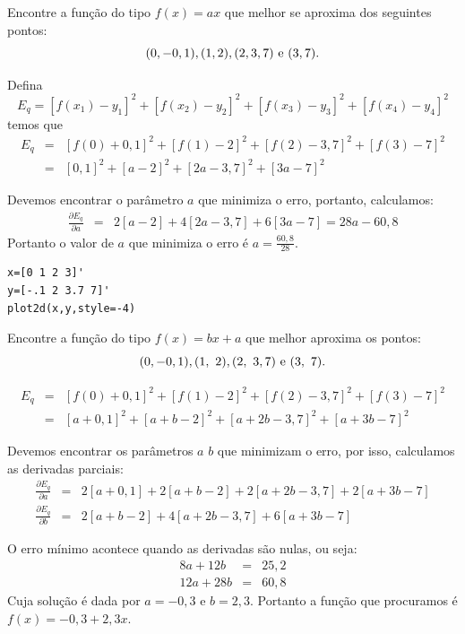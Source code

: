 \begin{ex} Encontre a função do tipo $f(x)=ax$ que melhor se aproxima dos seguintes pontos:
  \begin{equation*}
    (0, -0,1), (1, 2), (2, 3,7) ~ \hbox{e} ~(3, 7).  
  \end{equation*}
\end{ex}
\begin{sol}
Defina $$E_q=[f(x_1)-y_1]^2+[f(x_2)-y_2]^2+[f(x_3)-y_3]^2+[f(x_4)-y_4]^2$$
temos que
\begin{eqnarray*}
E_q&=&[f(0)+0,1]^2+[f(1)-2]^2+[f(2)-3,7]^2+[f(3)-7]^2\\
&=&[0,1]^2+[a-2]^2+[2a-3,7]^2+[3a-7]^2
\end{eqnarray*}

Devemos encontrar o parâmetro $a$ que minimiza o erro, portanto, calculamos:
\begin{eqnarray*}
\frac{\partial E_q}{\partial a}&=&2[a-2]+4[2a-3,7]+6[3a-7]=28a-60,8
\end{eqnarray*}
Portanto o valor de $a$ que minimiza o erro é $a=\frac{60,8}{28}$.
\ifisscilab
\begin{verbatim}
x=[0 1 2 3]'
y=[-.1 2 3.7 7]'
plot2d(x,y,style=-4)
\end{verbatim}
\fi
\end{sol}

\begin{ex}Encontre a função do tipo $f(x)=bx+a$ que melhor aproxima os pontos:
  \begin{equation*}
    (0,-0,1), (1,~2), (2,~3,7) ~ \hbox{e} ~(3,~7).  
  \end{equation*}
\end{ex}
\begin{sol}
\begin{eqnarray*}
E_q&=&[f(0)+0,1]^2+[f(1)-2]^2+[f(2)-3,7]^2+[f(3)-7]^2\\
&=&[a+0,1]^2+[a+b-2]^2+[a+2b-3,7]^2+[a+3b-7]^2
\end{eqnarray*}

Devemos encontrar os parâmetros $a$ $b$ que minimizam o erro, por isso, calculamos as derivadas parciais:
\begin{eqnarray*}
\frac{\partial E_q}{\partial a}&=&2[a+0,1]+2[a+b-2]+2[a+2b-3,7]+2[a+3b-7]\\
\frac{\partial E_q}{\partial b}&=&2[a+b-2]+4[a+2b-3,7]+6[a+3b-7]
\end{eqnarray*}



O erro mínimo acontece quando as derivadas são nulas, ou seja:
\begin{eqnarray*}
8a+12b&=&25,2\\
12a+28b&=&60,8
\end{eqnarray*}
Cuja solução é dada por $a=-0,3$ e $b=2,3$.
Portanto a função que procuramos é $f(x)=-0,3 +2,3x$.  
\end{sol}



